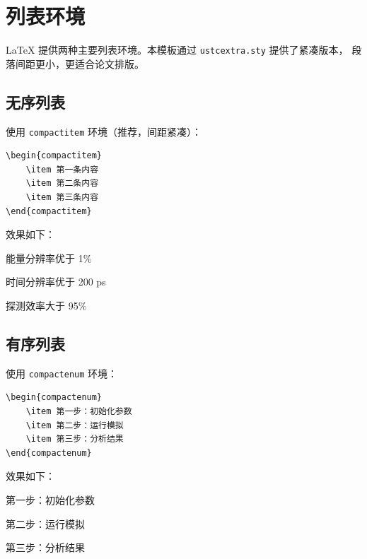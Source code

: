 \section{列表环境}

\LaTeX{} 提供两种主要列表环境。本模板通过 \texttt{ustcextra.sty} 提供了紧凑版本，
段落间距更小，更适合论文排版。

\subsection{无序列表}

使用 \texttt{compactitem} 环境（推荐，间距紧凑）：

\begin{verbatim}
\begin{compactitem}
    \item 第一条内容
    \item 第二条内容
    \item 第三条内容
\end{compactitem}
\end{verbatim}

效果如下：
\begin{compactitem}
    \item 能量分辨率优于 1\%
    \item 时间分辨率优于 200 ps
    \item 探测效率大于 95\%
\end{compactitem}

\subsection{有序列表}

使用 \texttt{compactenum} 环境：

\begin{verbatim}
\begin{compactenum}
    \item 第一步：初始化参数
    \item 第二步：运行模拟
    \item 第三步：分析结果
\end{compactenum}
\end{verbatim}

效果如下：
\begin{compactenum}
    \item 第一步：初始化参数
    \item 第二步：运行模拟
    \item 第三步：分析结果
\end{compactenum}

